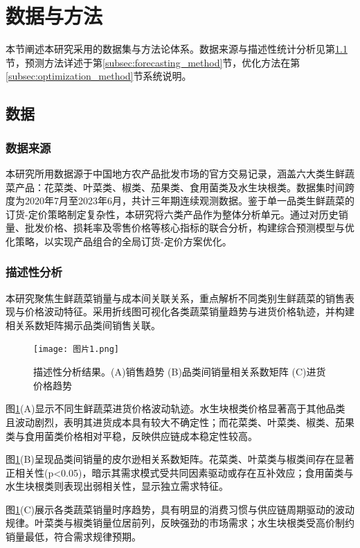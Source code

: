 \documentclass[lang=cn,12pt,a4paper]{elegantpaper}
\begin{document}
\section{数据与方法}
\label{sec:data_methodology}
本节阐述本研究采用的数据集与方法论体系。数据来源与描述性统计分析见第\ref{subsec:data}节，预测方法详述于第\ref{subsec:forecasting_method}节，优化方法在第\ref{subsec:optimization_method}节系统说明。

\subsection{数据}
\label{subsec:data}

\subsubsection{数据来源}
\label{subsubsec:data_sources}
本研究所用数据源于中国地方农产品批发市场的官方交易记录，涵盖六大类生鲜蔬菜产品：花菜类、叶菜类、椒类、茄果类、食用菌类及水生块根类。数据集时间跨度为2020年7月至2023年6月，共计三年期连续观测数据。鉴于单一品类生鲜蔬菜的订货-定价策略制定复杂性，本研究将六类产品作为整体分析单元。通过对历史销量、批发价格、损耗率及零售价格等核心指标的联合分析，构建综合预测模型与优化策略，以实现产品组合的全局订货-定价方案优化。

\subsubsection{描述性分析}
\label{subsubsec:descriptive_analysis}
本研究聚焦生鲜蔬菜销量与成本间关联关系，重点解析不同类别生鲜蔬菜的销售表现与价格波动特征。采用折线图可视化各类蔬菜销量趋势与进货价格轨迹，并构建相关系数矩阵揭示品类间销售关联。

\begin{figure}[H]
    \centering
    \texttt{[image: 图片1.png]}
    \caption{描述性分析结果。(A)销售趋势 (B)品类间销量相关系数矩阵 (C)进货价格趋势}
    \label{fig:fig1}
\end{figure}

图\ref{fig:fig1}(A)显示不同生鲜蔬菜进货价格波动轨迹。水生块根类价格显著高于其他品类且波动剧烈，表明其进货成本具有较大不确定性；而花菜类、叶菜类、椒类、茄果类与食用菌类价格相对平稳，反映供应链成本稳定性较高。

图\ref{fig:fig1}(B)呈现品类间销量的皮尔逊相关系数矩阵。花菜类、叶菜类与椒类间存在显著正相关性(p<0.05)，暗示其需求模式受共同因素驱动或存在互补效应；食用菌类与水生块根类则表现出弱相关性，显示独立需求特征。

图\ref{fig:fig1}(C)展示各类蔬菜销量时序趋势，具有明显的消费习惯与供应链周期驱动的波动规律。叶菜类与椒类销量位居前列，反映强劲的市场需求；水生块根类受高价制约销量最低，符合需求规律预期。
\end{document}
